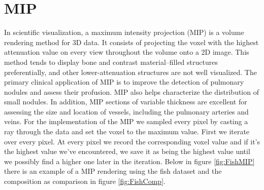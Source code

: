 \documentclass[a4paper,twoside,11pt]{article}
\begin{document}
\section{MIP}
In scientific visualization, a maximum intensity projection (MIP) is a volume rendering method for 3D data. It consists of projecting the voxel with the highest attenuation value on every view throughout the volume onto a 2D image. \newline
This method tends to display bone and contrast material–filled structures preferentially, and other lower-attenuation structures are not well visualized. The primary clinical application of MIP is to improve the detection of pulmonary nodules and assess their profusion. MIP also helps characterize the distribution of small nodules. In addition, MIP sections of variable thickness are excellent for assessing the size and location of vessels, including the pulmonary arteries and veins. \newline
For the implementation of the MIP we sampled every pixel by casting a ray through the data and set the voxel to the maximum value. First we iterate over every pixel. At every pixel we record the corresponding voxel value and if it's the highest value we've encountered, we save it as being the highest value until we possibly find a higher one later in the iteration. \newline
Below in figure \ref{fig:FishMIP} there is an example of a MIP rendering using the fish dataset and the composition as comparison in figure \ref{fig:FishComp}.
\end{document}
